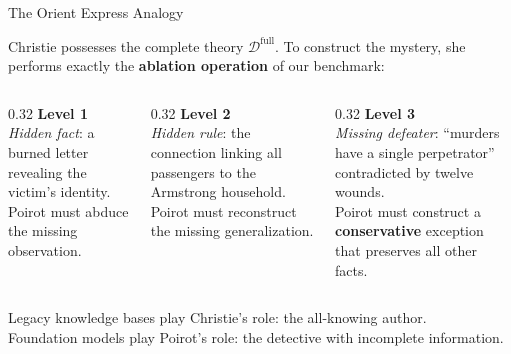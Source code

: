\documentclass[aspectratio=169]{beamer}
\newcommand{\Dfull}{\mathcal{D}^{\mathrm{full}}}
\begin{document}
\begin{frame}{The Orient Express Analogy}

\small
Christie possesses the complete theory $\Dfull$. To construct the mystery, she performs exactly the \textbf{ablation operation} of our benchmark:

\vspace{0.3em}
\begin{columns}[T]
\begin{column}{0.32\textwidth}
\textbf{\textcolor{defabgreen}{Level 1}}\\[2pt]
\footnotesize
\textit{Hidden fact}: a burned letter revealing the victim's identity.\\[3pt]
Poirot must abduce the missing observation.
\end{column}
\begin{column}{0.32\textwidth}
\textbf{\textcolor{defabgold}{Level 2}}\\[2pt]
\footnotesize
\textit{Hidden rule}: the connection linking all passengers to the Armstrong household.\\[3pt]
Poirot must reconstruct the missing generalization.
\end{column}
\begin{column}{0.32\textwidth}
\textbf{\textcolor{defabredish}{Level 3}}\\[2pt]
\footnotesize
\textit{Missing defeater}: ``murders have a single perpetrator'' contradicted by twelve wounds.\\[3pt]
Poirot must construct a \textbf{conservative} exception that preserves all other facts.
\end{column}
\end{columns}

\vspace{0.6em}
\normalsize
Legacy knowledge bases play Christie's role: the all-knowing author.\\
Foundation models play Poirot's role: the detective with incomplete information.
\end{frame}
\end{document}
